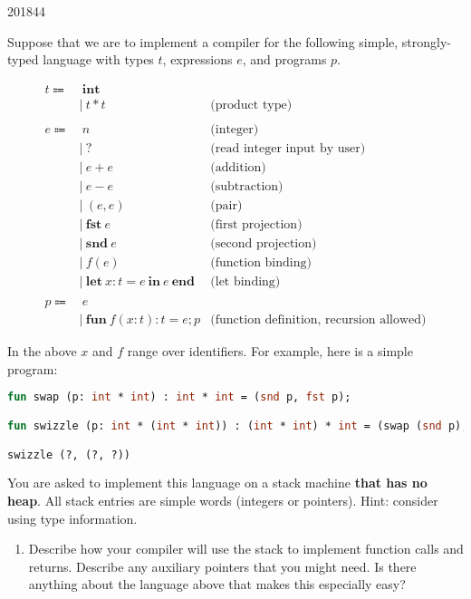 \documentclass[10pt,\jkfside,a4paper]{article}
\newcommand{\tbr}[1]{\text{(#1)}}
\begin{document}
\begin{examquestion}{2018}{4}{4}

Suppose that we are to implement a compiler for the following simple, 
strongly-typed language with types $t$, expressions $e$, and programs $p$.

\begin{align*}
t \Coloneqq& \ \mathbf{int} \\
&| \ t * t & \tbr{product type} \\
\\
e \Coloneqq& \ n & \tbr{integer} \\
&| \ \mathbf{?} & \tbr{read integer input by user} \\
&| \ e + e & \tbr{addition} \\
&| \ e - e & \tbr{subtraction} \\
&| \ (e,e) & \tbr{pair} \\
&| \ \mathbf{fst} \ e & \tbr{first projection} \\
&| \ \mathbf{snd} \ e & \tbr{second projection} \\
&| \ f(e) & \tbr{function binding} \\
&| \ \mathbf{let} \ x:t = e \ \mathbf{in} \ e \ \mathbf{end} & \tbr{let
binding} \\
\\
p \Coloneqq& \ e \\
&| \ \mathbf{fun} \ f(x: t): t = e; p & \tbr{function definition, recursion
allowed}
\end{align*}

In the above $x$ and $f$ range over identifiers. For example, here is a 
simple program:

\begin{lstlisting}[language=Caml]
fun swap (p: int * int) : int * int = (snd p, fst p);

fun swizzle (p: int * (int * int)) : (int * int) * int = (swap (snd p), fst p) ;

swizzle (?, (?, ?))
\end{lstlisting}

You are asked to implement this language on a stack machine \textbf{that has
no heap}. All stack entries are simple words (integers or pointers). Hint:
consider using type information.

\begin{enumerate}

\item Describe how your compiler will use the stack to implement function
calls and returns. Describe any auxiliary pointers that you might need. Is
there anything about the language above that makes this especially easy?


\end{enumerate}
\end{examquestion}
\end{document}
